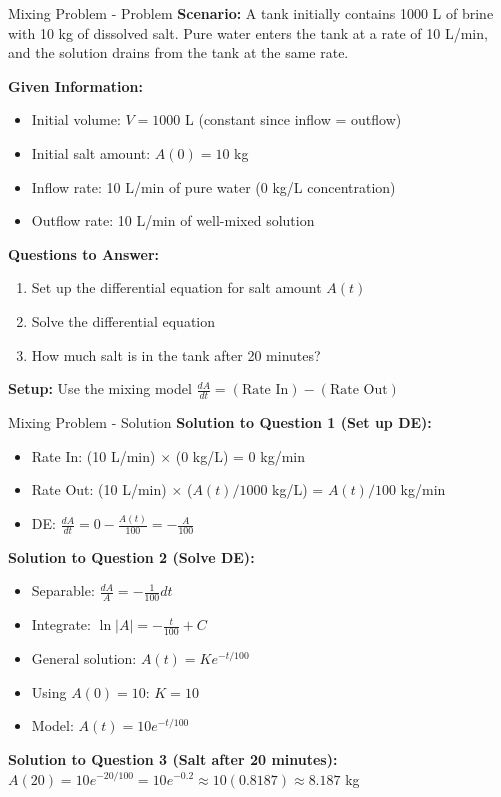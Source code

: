 \documentclass[10pt,aspectratio=169]{beamer}
\begin{document}
\begin{frame}{Mixing Problem - Problem}
    \textbf{Scenario:} A tank initially contains 1000 L of brine with 10 kg of dissolved salt. Pure water enters the tank at a rate of 10 L/min, and the solution drains from the tank at the same rate.
    
    \textbf{Given Information:}
    \begin{itemize}
        \item Initial volume: $V = 1000$ L (constant since inflow = outflow)
        \item Initial salt amount: $A(0) = 10$ kg
        \item Inflow rate: 10 L/min of pure water (0 kg/L concentration)
        \item Outflow rate: 10 L/min of well-mixed solution
    \end{itemize}
    
    \textbf{Questions to Answer:}
    \begin{enumerate}
        \item Set up the differential equation for salt amount $A(t)$
        \item Solve the differential equation
        \item How much salt is in the tank after 20 minutes?
    \end{enumerate}
    
    \textbf{Setup:} Use the mixing model $\frac{dA}{dt} = (\text{Rate In}) - (\text{Rate Out})$
\end{frame}

\begin{frame}{Mixing Problem - Solution}
    \textbf{Solution to Question 1 (Set up DE):}
    \begin{itemize}
        \item Rate In: (10 L/min) $\times$ (0 kg/L) = 0 kg/min
        \item Rate Out: (10 L/min) $\times$ ($A(t)/1000$ kg/L) = $A(t)/100$ kg/min
        \item DE: $\frac{dA}{dt} = 0 - \frac{A(t)}{100} = -\frac{A}{100}$
    \end{itemize}
    
    \textbf{Solution to Question 2 (Solve DE):}
    \begin{itemize}
        \item Separable: $\frac{dA}{A} = -\frac{1}{100} dt$
        \item Integrate: $\ln|A| = -\frac{t}{100} + C$
        \item General solution: $A(t) = Ke^{-t/100}$
        \item Using $A(0) = 10$: $K = 10$
        \item Model: $A(t) = 10e^{-t/100}$
    \end{itemize}
    
    \textbf{Solution to Question 3 (Salt after 20 minutes):}
    $A(20) = 10e^{-20/100} = 10e^{-0.2} \approx 10(0.8187) \approx 8.187$ kg
\end{frame}
\end{document}

